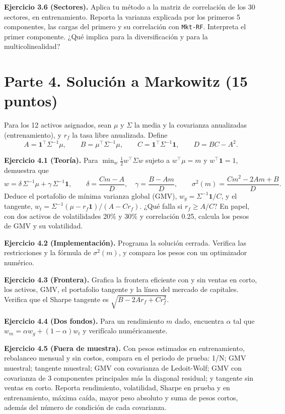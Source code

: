 \documentclass[11pt,letterpaper]{article}
\newcommand{\unos}{\mathbf 1}
\newcommand{\ejercicio}[1]{\par\medskip\textbf{Ejercicio #1.}\space}
\begin{document}
\ejercicio{3.6 (Sectores)} Aplica tu método a la matriz de correlación de los 30 sectores, en entrenamiento. Reporta la varianza explicada por los primeros 5 componentes, las cargas del primero y su correlación con \texttt{Mkt-RF}. Interpreta el primer componente. ¿Qué implica para la diversificación y para la multicolinealidad?

\section*{Parte 4. Solución a Markowitz (15 puntos)}

Para los 12 activos asignados, sean $\mu$ y $\Sigma$ la media y la covarianza anualizadas (entrenamiento), y $r_f$ la tasa libre anualizada. Define
\[
A=\unos^\top\Sigma^{-1}\mu,\qquad B=\mu^\top\Sigma^{-1}\mu,\qquad C=\unos^\top\Sigma^{-1}\unos,\qquad D=BC-A^2.
\]

\ejercicio{4.1 (Teoría)} Para $\min_w\tfrac12w^\top\Sigma w$ sujeto a $w^\top\mu=m$ y $w^\top\unos=1$, demuestra que
\[
w=\delta\,\Sigma^{-1}\mu+\gamma\,\Sigma^{-1}\unos,\qquad
\delta=\frac{Cm-A}{D},\quad\gamma=\frac{B-Am}{D},\qquad
\sigma^2(m)=\frac{Cm^2-2Am+B}{D}.
\]
Deduce el portafolio de mínima varianza global (GMV), $w_g=\Sigma^{-1}\unos/C$, y el tangente, $w_t=\Sigma^{-1}(\mu-r_f\unos)/(A-Cr_f)$. ¿Qué falla si $r_f\ge A/C$? En papel, con dos activos de volatilidades 20\% y 30\% y correlación 0.25, calcula los pesos de GMV y su volatilidad.

\ejercicio{4.2 (Implementación)} Programa la solución cerrada. Verifica las restricciones y la fórmula de $\sigma^2(m)$, y compara los pesos con un optimizador numérico.

\ejercicio{4.3 (Frontera)} Grafica la frontera eficiente con y sin ventas en corto, los activos, GMV, el portafolio tangente y la línea del mercado de capitales. Verifica que el Sharpe tangente es $\sqrt{B-2Ar_f+Cr_f^2}$.

\ejercicio{4.4 (Dos fondos)} Para un rendimiento $m$ dado, encuentra $\alpha$ tal que $w_m=\alpha w_g+(1-\alpha)w_t$ y verifícalo numéricamente.

\ejercicio{4.5 (Fuera de muestra)} Con pesos estimados en entrenamiento, rebalanceo mensual y sin costos, compara en el periodo de prueba: 1/N; GMV muestral; tangente muestral; GMV con covarianza de Ledoit-Wolf; GMV con covarianza de 3 componentes principales más la diagonal residual; y tangente sin ventas en corto. Reporta rendimiento, volatilidad, Sharpe en prueba y en entrenamiento, máxima caída, mayor peso absoluto y suma de pesos cortos, además del número de condición de cada covarianza.
\end{document}
